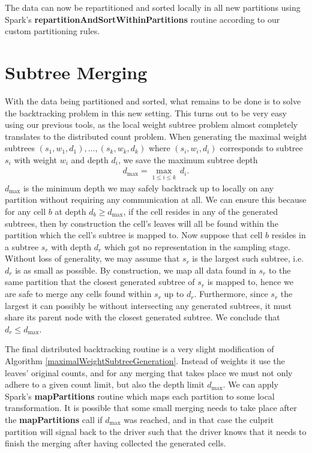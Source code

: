 \documentclass{report}
\begin{document}
\noindent \newline The data can now be repartitioned and sorted locally in all new partitions using Spark's \textbf{repartitionAndSortWithinPartitions} routine according to our custom partitioning rules.

\section{Subtree Merging}
With the data being partitioned and sorted, what remains to be done is to solve the backtracking problem in this new setting. This turns out to be very easy using our 
previous tools, as the local weight subtree problem almost completely translates to the distributed count problem. When generating the maximal weight subtrees $(s_1, w_1, d_1),\dots,(s_k, w_k, d_k)$ where $(s_i,w_i,d_i)$
corresponds to subtree $s_i$ with weight $w_i$ and depth $d_i$, we save the maximum subtree depth 
\begin{align*}
	d_{\text{max}} = \underset{1\leq i \leq k}{\max} \ d_i.
\end{align*}
$d_{\text{max}}$ is the minimum depth we may safely backtrack up to locally on any partition without requiring any communication at all. We can ensure this because for any cell $b$ at depth $d_b \geq 
d_{\text{max}}$, if the cell resides in any of the generated subtrees, then by construction the cell's leaves will all be found within the partition which the cell's subtree is mapped to. Now suppose that cell $b$ resides
in a subtree $s_r$ with depth $d_r$ which got no representation in the sampling stage. Without loss of generality, we may assume that $s_r$ is the largest such subtree, i.e. $d_r$ is as small as possible.
By construction, we map all data found in $s_r$ to the same partition that the closest generated subtree of $s_r$ is mapped to, hence we are safe to merge any cells found within $s_r$ up to $d_r$. Furthermore, since $s_r$ the largest
it can possibly be without intersecting any generated subtrees, it must share its parent node with the closest generated subtree. We conclude that $d_r \leq d_{\text{max}}$. 

The final distributed backtracking routine is a very slight modification of Algorithm \ref{maximalWeightSubtreeGeneration}. Instead of weights it use the leaves' original counts, and for any merging that takes place
we must not only adhere to a given count limit, but also the depth limit $d_{\text{max}}$. We can apply Spark's \textbf{mapPartitions} routine which maps each partition to some local transformation.  
It is possible that some small merging needs to take place after the \textbf{mapPartitions} call if $d_{\text{max}}$ was reached, and in that case the culprit partition will signal back to the driver such that 
the driver knows that it needs to finish the merging after having collected the generated cells.
\end{document}
